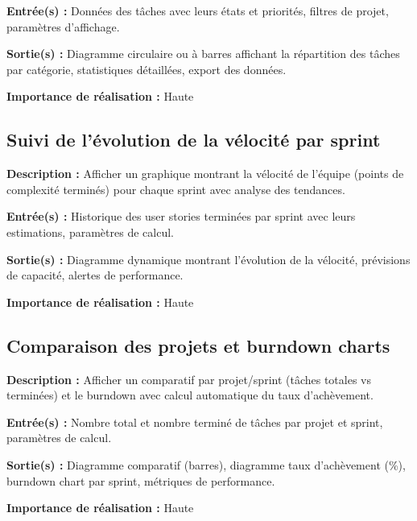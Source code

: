 \textbf{Entrée(s) :} Données des tâches avec leurs états et priorités, filtres de projet, paramètres d'affichage.

\textbf{Sortie(s) :} Diagramme circulaire ou à barres affichant la répartition des tâches par catégorie, statistiques détaillées, export des données.

\textbf{Importance de réalisation :} Haute

\subsection{Suivi de l'évolution de la vélocité par sprint}
\textbf{Description :} Afficher un graphique montrant la vélocité de l'équipe (points de complexité terminés) pour chaque sprint avec analyse des tendances.

\textbf{Entrée(s) :} Historique des user stories terminées par sprint avec leurs estimations, paramètres de calcul.

\textbf{Sortie(s) :} Diagramme dynamique montrant l'évolution de la vélocité, prévisions de capacité, alertes de performance.

\textbf{Importance de réalisation :} Haute

\subsection{Comparaison des projets et burndown charts}
\textbf{Description :} Afficher un comparatif par projet/sprint (tâches totales vs terminées) et le burndown avec calcul automatique du taux d'achèvement.

\textbf{Entrée(s) :} Nombre total et nombre terminé de tâches par projet et sprint, paramètres de calcul.

\textbf{Sortie(s) :} Diagramme comparatif (barres), diagramme taux d'achèvement (\%), burndown chart par sprint, métriques de performance.

\textbf{Importance de réalisation :} Haute

